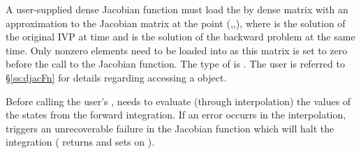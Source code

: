 {
  A user-supplied dense Jacobian function must load the  by 
  dense matrix  with an approximation to the Jacobian matrix
  at the point (,,), where  is the solution
  of the original IVP at time  and  is the solution of the
  backward problem at the same time.
  Only nonzero elements need to be loaded into  as this matrix 
  is set to zero before the call to the Jacobian function. 
  The type of  is . The user is referred to 
  \S\ref{ss:djacFn} for details regarding accessing a  object.

  {\warn}Before calling the user's , {\cvodea} needs to evaluate
  (through interpolation) the values of the states from the forward integration. 
  If an error occurrs in the interpolation, {\cvodea} triggers an unrecoverable
  failure in the Jacobian function which will halt the integration
  ( returns  and {\cvdense} sets  on 
  ).
}


